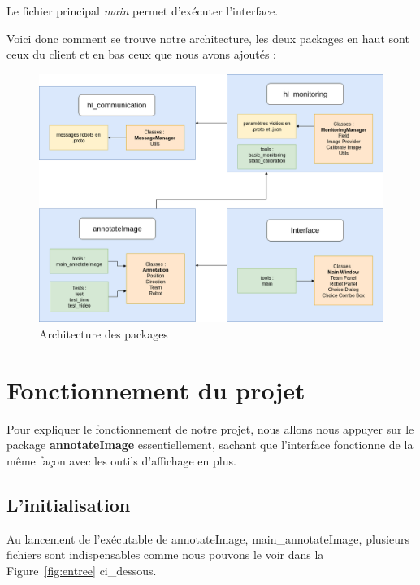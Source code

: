 Le fichier principal \textit{main} permet d'exécuter
l'interface.
\bigskip

Voici donc comment se trouve notre architecture, les deux
packages en haut sont ceux du client et en bas ceux que nous
avons ajoutés :

\begin{figure}[H] 
\centering 
\includegraphics[scale = 0.3]{images/architecture.png}
    \caption{Architecture des packages}
\end{figure} 


\section{Fonctionnement du projet}

Pour expliquer le fonctionnement de notre projet, nous allons 
nous appuyer sur le package \textbf{annotateImage} 
essentiellement, sachant que l'interface fonctionne de la même 
façon avec les outils d'affichage en plus.

\subsection{L'initialisation}

Au lancement de l'exécutable de annotateImage, 
main\_annotateImage, plusieurs fichiers sont indispensables comme
nous pouvons le voir dans la Figure~\ref{fig:entree} ci\_dessous.


